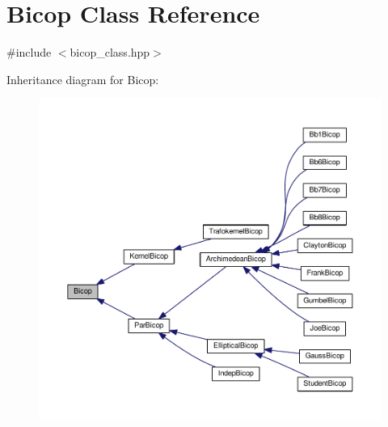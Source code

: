 \hypertarget{class_bicop}{}\section{Bicop Class Reference}
\label{class_bicop}


{\ttfamily \#include $<$bicop\+\_\+class.\+hpp$>$}



Inheritance diagram for Bicop\+:\nopagebreak
\begin{figure}[H]
\begin{center}
\leavevmode
\includegraphics[width=350pt]{class_bicop__inherit__graph}
\end{center}
\end{figure}
